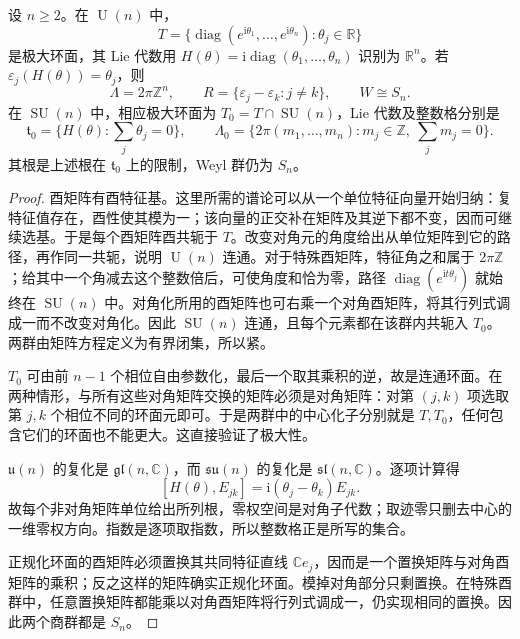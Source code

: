 \begin{proposition}\label{g1:prop:unitary-torus-roots}
	设 \(n\ge2\)。在 \(\operatorname{U}(n)\) 中，
	\[
		T=\{\operatorname{diag}(e^{\mathrm{i}\theta_1},\ldots,e^{\mathrm{i}\theta_n}):\theta_j\in\mathbb R\}
	\]
	是极大环面，其 Lie 代数用 \(H(\theta)=\mathrm{i}\operatorname{diag}(\theta_1,\ldots,\theta_n)\) 识别为 \(\mathbb R^n\)。若 \(\varepsilon_j(H(\theta))=\theta_j\)，则
	\[
		\Lambda=2\pi\mathbb Z^n,\qquad
		R=\{\varepsilon_j-\varepsilon_k:j\ne k\},\qquad
		W\cong S_n.
	\]
	在 \(\operatorname{SU}(n)\) 中，相应极大环面为 \(T_0=T\cap\operatorname{SU}(n)\)，Lie 代数及整数格分别是
	\[
		\mathfrak t_0=\{H(\theta):\textstyle\sum_j\theta_j=0\},\qquad
		\Lambda_0=\{2\pi(m_1,\ldots,m_n):m_j\in\mathbb Z,\ \textstyle\sum_jm_j=0\}.
	\]
	其根是上述根在 \(\mathfrak t_0\) 上的限制，Weyl 群仍为 \(S_n\)。
\end{proposition}
\begin{proof}
	酉矩阵有酉特征基。这里所需的谱论可以从一个单位特征向量开始归纳：复特征值存在，酉性使其模为一；该向量的正交补在矩阵及其逆下都不变，因而可继续选基。于是每个酉矩阵酉共轭于 \(T\)。改变对角元的角度给出从单位矩阵到它的路径，再作同一共轭，说明 \(\operatorname{U}(n)\) 连通。对于特殊酉矩阵，特征角之和属于 \(2\pi\mathbb Z\)；给其中一个角减去这个整数倍后，可使角度和恰为零，路径 \(\operatorname{diag}(e^{\mathrm{i}t\theta_j})\) 就始终在 \(\operatorname{SU}(n)\) 中。对角化所用的酉矩阵也可右乘一个对角酉矩阵，将其行列式调成一而不改变对角化。因此 \(\operatorname{SU}(n)\) 连通，且每个元素都在该群内共轭入 \(T_0\)。两群由矩阵方程定义为有界闭集，所以紧。

	\(T_0\) 可由前 \(n-1\) 个相位自由参数化，最后一个取其乘积的逆，故是连通环面。在两种情形，与所有这些对角矩阵交换的矩阵必须是对角矩阵：对第 \((j,k)\) 项选取第 \(j,k\) 个相位不同的环面元即可。于是两群中的中心化子分别就是 \(T,T_0\)，任何包含它们的环面也不能更大。这直接验证了极大性。

	\(\mathfrak u(n)\) 的复化是 \(\mathfrak{gl}(n,\mathbb C)\)，而 \(\mathfrak{su}(n)\) 的复化是 \(\mathfrak{sl}(n,\mathbb C)\)。逐项计算得
	\[
		[H(\theta),E_{jk}]=\mathrm{i}(\theta_j-\theta_k)E_{jk}.
	\]
	故每个非对角矩阵单位给出所列根，零权空间是对角子代数；取迹零只删去中心的一维零权方向。指数是逐项取指数，所以整数格正是所写的集合。

	正规化环面的酉矩阵必须置换其共同特征直线 \(\mathbb Ce_j\)，因而是一个置换矩阵与对角酉矩阵的乘积；反之这样的矩阵确实正规化环面。模掉对角部分只剩置换。在特殊酉群中，任意置换矩阵都能乘以对角酉矩阵将行列式调成一，仍实现相同的置换。因此两个商群都是 \(S_n\)。
\end{proof}

